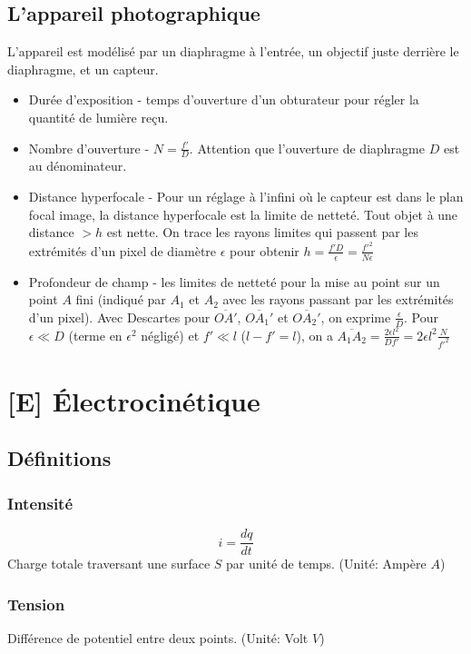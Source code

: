 \documentclass[openany]{book}
\begin{document}
\section{L'appareil photographique}
L’appareil est modélisé par un diaphragme à l'entrée, un objectif juste derrière le diaphragme, et un capteur. 
\begin{itemize}
    \item Durée d'exposition - temps d'ouverture d'un obturateur pour régler la quantité de lumière reçu. 
    \item Nombre d'ouverture - $ N = \frac{f'}{D} $. Attention que l'ouverture de diaphragme $ D $ est au dénominateur. 
    \item Distance hyperfocale - Pour un réglage à l'infini où le capteur est dans le plan focal image, la distance hyperfocale est la limite de netteté. Tout objet à une distance $> h$ est nette. On trace les rayons limites qui passent par les extrémités d'un pixel de diamètre $\epsilon$ pour obtenir $h = \frac{f'D}{\epsilon} = \frac{f'^2}{N\epsilon} $
    \item Profondeur de champ - les limites de netteté pour la mise au point sur un point $A$ fini (indiqué par $A_1$ et $A_2$ avec les rayons passant par les extrémités d'un pixel). Avec Descartes pour $\overline{OA'}$, $\overline{OA_1'}$ et $\overline{OA_2'}$, on exprime $\frac{\epsilon}{D}$. Pour $\epsilon \ll D$ (terme en $\epsilon^2$ négligé) et $f' \ll l$ ($ l - f' = l$), on a $\overline{A_1A_2}=\frac{2\epsilon l^2}{Df'} = 2\epsilon l^2\frac{N}{f'^2}$
\end{itemize}

\clearpage
\chapter{[E] Électrocinétique}

\section{Définitions}

\subsection{Intensité}
\[i = \frac{dq}{dt}\]  
Charge totale traversant une surface $S$ par unité de temps. (Unité: Ampère $A$) 

\subsection{Tension}
Différence de potentiel entre deux points. (Unité: Volt $V$)
\end{document}
